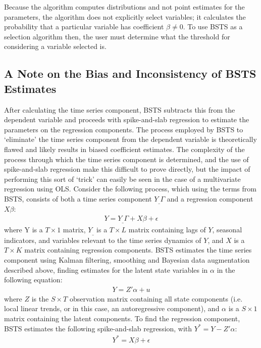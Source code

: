 Because the algorithm computes distributions and not point estimates for the parameters, the algorithm does not explicitly select variables; it calculates the probability that a particular variable has coefficient $\beta \neq 0$. To use BSTS as a selection algorithm then, the user must determine what the threshold for considering a variable selected is. 

\subsection {A Note on the Bias and Inconsistency of BSTS Estimates}

After calculating the time series component, BSTS subtracts this from the dependent variable and proceeds with spike-and-slab regression to estimate the parameters on the regression components. The process employed by BSTS to `eliminate' the time series component from the dependent variable is theoretically flawed and likely results in biased coefficient estimates. The complexity of the process through which the time series component is determined, and the use of spike-and-slab regression make this difficult to prove directly, but the impact of performing this sort of `trick' can easily be seen in the case of a multivariate regression using OLS. Consider the following process, which using the terms from BSTS, consists of both a time series component $Y_{\_}\Gamma$ and a regression component $X\beta$: 
\begin{align}
Y = Y_{\_}\Gamma  + X\beta + \epsilon \label{eqB}
\end{align}
where Y is a $T \times 1$ matrix, $Y_{\_}$ is a $T \times L$ matrix containing lags of $Y$, seasonal indicators, and variables relevant to the time series dynamics of $Y$, and $X$ is a $T \times K$ matrix containing regression components.  BSTS estimates the time series component using Kalman filtering, smoothing and Bayesian data augmentation described above, finding estimates for the latent state variables in $\alpha$ in the following equation:
\begin{align}
Y= Z' \alpha  + u
\end{align}
where $Z$ is the $S \times T$ observation matrix containing all state components (i.e. local linear trends, or in this case, an autoregressive component), and $\alpha$ is a $S \times 1$ matrix containing the latent components. To find the regression component, BSTS estimates the following spike-and-slab regression, with $Y^{*} = Y - Z'\alpha$:
\begin{align}
Y^{*} =  X\beta + \epsilon \label{eqA}
\end{align}
